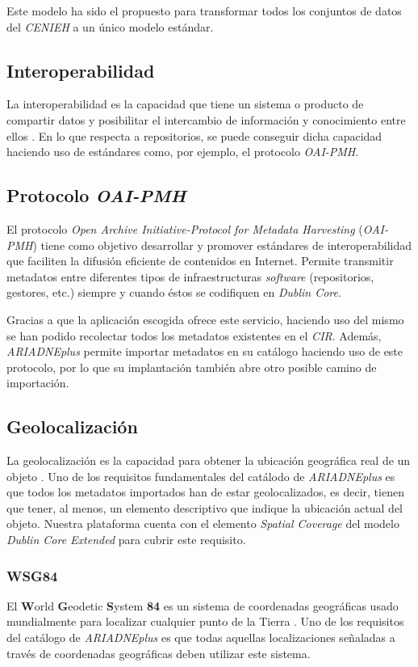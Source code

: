 Este modelo ha sido el propuesto para transformar todos los conjuntos de 
datos del \emph{CENIEH} a un único modelo estándar.

\subsection{Interoperabilidad}

La interoperabilidad es la capacidad que tiene un sistema o producto de
compartir datos y posibilitar el intercambio de información y
conocimiento entre ellos \cite{interop:web}.
En lo que respecta a repositorios, se puede conseguir dicha capacidad
haciendo uso de estándares como, por ejemplo, el protocolo
\emph{OAI-PMH}.

\subsection{Protocolo \emph{OAI-PMH}}

El protocolo \emph{Open Archive Initiative-Protocol for Metadata
Harvesting} (\emph{OAI-PMH}) tiene como objetivo desarrollar y promover
estándares de interoperabilidad que faciliten la difusión eficiente de
contenidos en Internet. Permite transmitir metadatos entre diferentes
tipos de infraestructuras \emph{software} (repositorios, gestores, etc.)
siempre y cuando éstos se codifiquen en \emph{Dublin Core}.

Gracias a que la aplicación escogida ofrece este servicio, haciendo uso
del mismo se han podido recolectar todos los metadatos existentes en el
\emph{CIR}. Además, \emph{ARIADNEplus} permite importar metadatos en su catálogo
haciendo uso de este protocolo, por lo que su implantación también abre
otro posible camino de importación.


\subsection{Geolocalización}

La geolocalización es la capacidad para obtener la ubicación geográfica
real de un objeto \cite{wiki:geo}. Uno de
los requisitos fundamentales del catálodo de \emph{ARIADNEplus} es que todos
los metadatos importados han de estar geolocalizados, es decir, tienen
que tener, al menos, un elemento descriptivo que indique la ubicación
actual del objeto. Nuestra plataforma cuenta con el elemento
\emph{Spatial Coverage} del modelo \emph{Dublin Core Extended} para
cubrir este requisito.

\subsubsection{WSG84}

El \textbf{W}orld \textbf{G}eodetic \textbf{S}ystem \textbf{84} es un
sistema de coordenadas geográficas usado mundialmente para localizar
cualquier punto de la Tierra \cite{wiki:wsg}. Uno de los requisitos del catálogo de
\emph{ARIADNEplus} es que todas aquellas localizaciones señaladas a través de
coordenadas geográficas deben utilizar este sistema.

